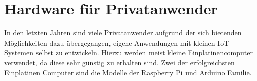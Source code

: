 \section{Hardware für Privatanwender}\label{s:DIY}

In den letzten Jahren sind viele Privatanwender aufgrund der sich bietenden Möglichkeiten dazu übergegangen, eigene Anwendungen mit kleinen \ac{IoT}-Systemen selbst zu entwickeln. Hierzu werden meist kleine Einplatinencomputer verwendet, da diese sehr günstig zu erhalten sind. 
Zwei der erfolgreichsten Einplatinen Computer sind die Modelle der Raspberry Pi und Arduino Familie.



